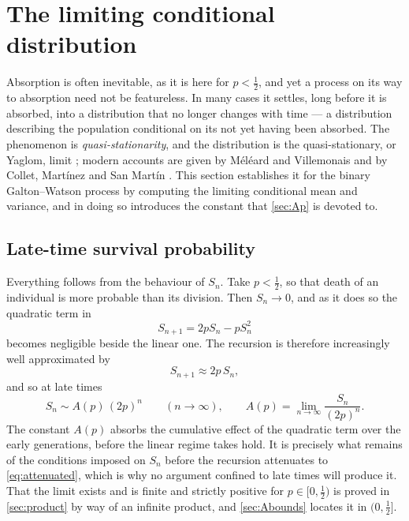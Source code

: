 \section{The limiting conditional distribution}
\label{sec:qsd}

Absorption is often inevitable, as it is here for $p<\tfrac12$, and yet a process
on its way to absorption need not be featureless. In many cases it settles, long
before it is absorbed, into a distribution that no longer changes with time --- a
distribution describing the population conditional on its not yet having been
absorbed. The phenomenon is \emph{quasi-stationarity}, and the distribution is the
quasi-stationary, or Yaglom, limit \cite{Yaglom1947}; modern accounts are given by
Méléard and Villemonais \cite{Meleard2012} and by Collet, Martínez and San Martín
\cite{Collet2013}. This section establishes it for the binary Galton--Watson
process by computing the limiting conditional mean and variance, and in doing so
introduces the constant that \cref{sec:Ap} is devoted to.

\subsection{Late-time survival probability}
\label{sec:lateS}

Everything follows from the behaviour of $S_n$. Take $p<\tfrac12$, so that death of
an individual is more probable than its division. Then $S_n\to0$, and as it does so
the quadratic term in
\begin{equation*}
S_{n+1} = 2pS_n - pS_n^2
\end{equation*}
becomes negligible beside the linear one. The recursion is therefore increasingly
well approximated by
\begin{equation}
\label{eq:attenuated}
S_{n+1}\approx 2p\,S_n ,
\end{equation}
and so at late times
\begin{equation}
\label{eq:lateS}
S_n \sim A(p)\,(2p)^n\qquad(n\to\infty),
\qquad
A(p) = \lim_{n\to\infty}\frac{S_n}{(2p)^n} .
\end{equation}
The constant $A(p)$ absorbs the cumulative effect of the quadratic term over the
early generations, before the linear regime takes hold. It is precisely what
remains of the conditions imposed on $S_n$ before the recursion attenuates to
\cref{eq:attenuated}, which is why no argument confined to late times will produce
it. That the limit exists and is finite and strictly positive for
$p\in[0,\tfrac12)$ is proved in \cref{sec:product} by way of an infinite product,
and \cref{sec:Abounds} locates it in $(0,\tfrac12]$.

